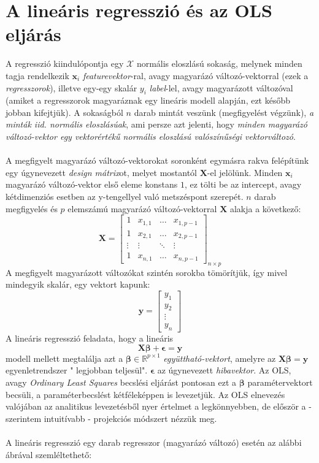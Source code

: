 \documentclass[14p]{report}
\def\pmb{\boldsymbol}
\begin{document}
\section{A lineáris regresszió és az OLS eljárás}
A regresszió kiindulópontja egy $\mathscr{X}$ normális eloszlású sokaság, melynek minden tagja rendelkezik $\pmb{x}_i$ \emph{featurevektor}-ral, avagy magyarázó változó-vektorral (ezek a \emph{regresszorok}), illetve egy-egy skalár $y_i$ \emph{label}-lel, avagy magyarázott változóval (amiket a regresszorok magyaráznak egy lineáris modell alapján, ezt később jobban kifejtjük). A sokaságból $n$ darab mintát veszünk (megfigyelést végzünk), \emph{a minták iid. normális eloszlásúak}, ami persze azt jelenti, hogy \emph{minden magyarázó változó-vektor egy vektorértékű normális eloszlású valószínűségi vektorváltozó}.
\\
\\
A megfigyelt magyarázó változó-vektorokat soronként egymásra rakva felépítünk egy úgynevezett \emph{design mátrix}ot, melyet mostantól $\pmb{X}$-el jelölünk. Minden $\pmb{x}_i$ magyarázó változó-vektor első eleme konstans $1$, ez tölti be az intercept, avagy kétdimenziós esetben az y-tengellyel való metszéspont szerepét. $n$ darab megfigyelés és $p$ elemszámú magyarázó változó-vektorral $\pmb{X}$ alakja a következő:
\[
	\pmb{X} = 
	\begin{bmatrix}
	1 & x_{1,1} & \dots & x_{1,p-1} \\
	1 & x_{2,1} & \dots & x_{2,p-1} \\
	\vdots & \vdots & \ddots & \vdots \\
	1 & x_{n,1} & \dots & x_{n,p-1}	
	\end{bmatrix}_{n \times p}
\]
A megfigyelt magyarázott változókat szintén sorokba tömörítjük, így mivel mindegyik skalár, egy vektort kapunk:
\[
	\pmb{y} =
	\begin{bmatrix}
		y_1 \\
		y_2 \\
		\vdots \\
		y_n
	\end{bmatrix}
\]
A lineáris regresszió feladata, hogy a lineáris 
\[
	\pmb{X}\pmb{\beta} + \pmb{\epsilon} = \pmb{y}
\]
modell mellett megtalálja azt a $\pmb{\beta} \in \mathbb{R}^{p \times 1}$ \emph{együttható-vektort}, amelyre az $\pmb{X}\pmb{\beta} = \pmb{y}$ egyenletrendszer " legjobban teljesül". $\pmb{\epsilon}$ az úgynevezett \emph{hibavektor}. Az OLS, avagy \emph{Ordinary Least Squares} becslési eljárást pontosan ezt a $\pmb{\beta}$ paramétervektort becsüli, a paraméterbecslést kétféleképpen is levezetjük. Az OLS elnevezés valójában az analitikus levezetésből nyer értelmet a legkönnyebben, de először a - szerintem intuitívabb - projekciós módszert nézzük meg. 
\\
\\
A lineáris regresszió egy darab regresszor (magyarázó változó) esetén az alábbi ábrával szemléltethető:
\end{document}
